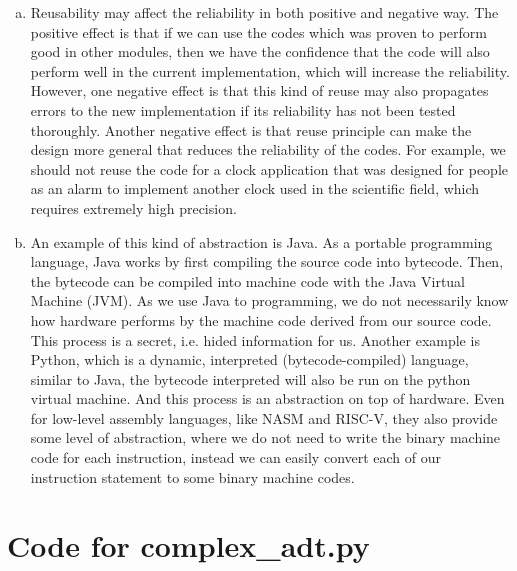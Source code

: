 \documentclass[12pt]{article}
\begin{document}
\begin{enumerate}[(a)]
\item Reusability may affect the reliability in both positive and negative way. The positive effect is that if we can use the codes which was proven to perform good in other modules, then we have the confidence that the code will also perform well in the current implementation, which will increase the reliability. However, one negative effect is that this kind of reuse may also propagates errors to the new implementation if its reliability has not been tested thoroughly. Another negative effect is that reuse principle can make the design more general that reduces the reliability of the codes. For example, we should not reuse the code for a  clock application that was designed for people as an alarm to implement another clock used in the scientific field, which requires extremely high precision.
\item An example of this kind of abstraction is Java. As a portable programming language, Java works by first compiling the source code into bytecode. Then, the bytecode can be compiled into machine code with the Java Virtual Machine (JVM). As we use Java to programming, we do not necessarily know how hardware performs by the machine code derived from our source code. This process is a secret, i.e. hided information for us. Another example is Python, which is a dynamic, interpreted (bytecode-compiled) language, similar to Java, the bytecode interpreted will also be run on the python virtual machine. And this process is an abstraction on top of hardware. Even for low-level assembly languages, like NASM and RISC-V, they also provide some level of abstraction, where we do not need to write the binary machine code for each instruction, instead we can easily convert each of our instruction statement to some binary machine codes.
\end{enumerate}
\newpage

\lstset{language=Python, basicstyle=\tiny, breaklines=true, showspaces=false,
  showstringspaces=false, breakatwhitespace=true}

\def\thesection{\Alph{section}}

\section{Code for complex\_adt.py}

\noindent 

\newpage
\end{document}
